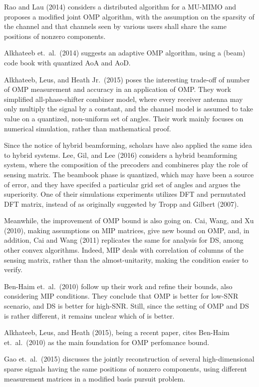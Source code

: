 Rao and Lau (2014) considers a distributed algorithm for a MU-MIMO and proposes a modified joint OMP algorithm, with the assumption on the sparsity of the channel and that channels seen by various users shall share the same positions of nonzero components.

Alkhateeb et.\ al.\ (2014) suggests an adaptive OMP algorithm, using a (beam) code book with quantized AoA and AoD.

Alkhateeb, Leus, and Heath Jr.\ (2015) poses the interesting trade-off of number of OMP measurement and accuracy in an application of OMP.
They work simplified all-phase-shifter combiner model, where every receiver antenna may only multiply the signal by a constant, and the channel model is assumed to take value on a quantized, non-uniform set of angles.
Their work mainly focuses on numerical simulation, rather than mathematical proof.

Since the notice of hybrid beamforming, scholars have also applied the same idea to hybrid systems.
Lee, Gil, and Lee (2016) considers a hybrid beamforming system, where the composition of the precoders and combineres play the role of sensing matrix.
The beambook phase is quantized, which may have been a source of error, and they have specifed a particular grid set of angles and argues the superiority.
One of their simulations experiments utilizes DFT and permutated DFT matrix, instead of as originally suggested by Tropp and Gilbert (2007).

Meanwhile, the improvement of OMP bound is also going on.
Cai, Wang, and Xu (2010), making assumptions on MIP matrices, give new bound on OMP, and, in addition, Cai and Wang (2011) replicates the same for analysis for DS, among other convex algorithms.
Indeed, MIP deals with correlation of columns of the sensing matrix, rather than the almost-unitarity, making the condition easier to verify.

Ben-Haim et.\ al.\ (2010) follow up their work and refine their bounds, also considering MIP conditions.
They conclude that OMP is better for low-SNR scenario, and DS is better for high-SNR.
Still, since the setting of OMP and DS is rather different, it remains unclear which of is better.

Alkhateeb, Leus, and Heath (2015), being a recent paper, cites Ben-Haim et.\ al.\ (2010) as the main foundation for OMP perfomance bound.

Gao et.\ al.\ (2015) discusses the jointly reconstruction of several high-dimensional sparse signals having the same positions of nonzero components, using different measurement matrices in a modified basis pursuit problem.

